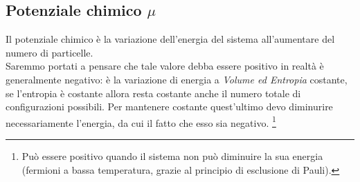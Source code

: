 \subsection{Potenziale chimico $\mu$}%
Il potenziale chimico è la variazione dell'energia del sistema all'aumentare del numero di particelle.\\
Saremmo portati a pensare che tale valore debba essere positivo in realtà è generalmente negativo: è la variazione di energia a \textit{Volume ed Entropia} costante, se l'entropia è costante allora resta costante anche il numero totale di configurazioni possibili. Per mantenere costante quest'ultimo devo diminurire necessariamente l'energia, da cui il fatto che esso sia negativo.
\footnote{Può essere positivo quando il sistema non può diminuire la sua energia (fermioni a bassa temperatura, grazie al principio di esclusione di Pauli).}
